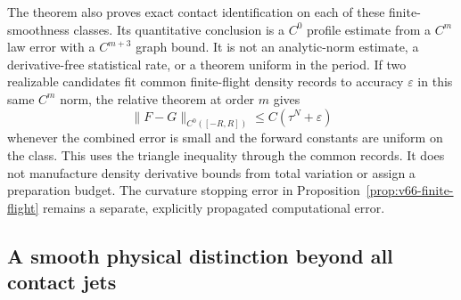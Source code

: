The theorem also proves exact contact identification on each of these
finite-smoothness classes.  Its quantitative conclusion is a $C^0$
profile estimate from a $C^m$ law error with a $C^{m+3}$ graph bound.
It is not an analytic-norm estimate, a derivative-free statistical
rate, or a theorem uniform in the period.  If two realizable candidates
fit common finite-flight density records to accuracy $\varepsilon$
in this same $C^m$ norm, the relative theorem at order $m$ gives
\[
 \|F-G\|_{C^0([-R,R])}\le C(\tau^N+\varepsilon)
\]
whenever the combined error is small and the forward constants are
uniform on the class.  This uses the triangle inequality through the
common records.  It does not manufacture density derivative bounds
from total variation or assign a preparation budget.  The curvature
stopping error in Proposition~\ref{prop:v66-finite-flight} remains a
separate, explicitly propagated computational error.

\subsection{A smooth physical distinction beyond all contact jets}

